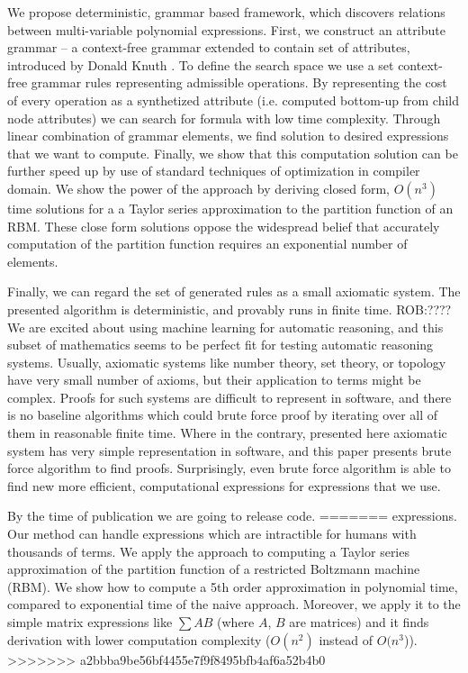 \documentclass{article}
\begin{document}
We propose deterministic, grammar based framework, which discovers relations between
multi-variable polynomial expressions. First, we construct an attribute grammar
-- a context-free grammar extended to contain set of attributes, introduced by
Donald Knuth \cite{knuth1968semantics}. To define the search space we use a set
context-free grammar rules representing admissible operations. By representing
the cost of every operation as a synthetized attribute (i.e. computed bottom-up from child node attributes)
we can search for formula with low time complexity.
Through linear combination of grammar elements, we find solution to desired 
expressions that we want to compute. Finally, we
show that this computation solution can be further speed up by use of standard
techniques of optimization in compiler domain. We show the power of the
approach by deriving closed form, $O(n^3)$ time solutions for a 
a Taylor series approximation to the partition
function of an RBM. These close form solutions oppose
the widespread belief that accurately computation of the partition function requires
an exponential number of elements.


Finally, we can regard the set of generated rules as a small axiomatic system.
The presented algorithm is deterministic, and provably runs in finite
time. ROB:????
We are excited about using machine learning for automatic reasoning, and
this subset of mathematics seems to be perfect fit for testing automatic reasoning systems.
Usually, axiomatic systems like number theory, set theory, or topology have very small
number of axioms, but their application to terms might be complex. Proofs
for such systems are difficult to represent in software, and there is no
baseline algorithms which could brute force proof by iterating over all of them in reasonable finite time.
Where in the contrary, presented here axiomatic system has very simple representation
in software, and this paper presents brute force algorithm to find proofs. 
Surprisingly, even brute force algorithm is able to find new more efficient,
computational expressions for expressions that we use.

By the time of publication we are going to release code.
=======
  expressions. Our method can handle expressions which are intractible
  for humans with thousands of
  terms. We apply the approach to
  computing a Taylor series approximation of the partition function of
  a restricted Boltzmann machine (RBM). We show how to compute a 5th
  order approximation in polynomial time, compared to exponential time
  of the naive approach. Moreover, we apply it to the simple
  matrix expressions like $\sum AB$ (where $A$, $B$ are matrices) and it finds
  derivation with lower computation complexity ($O(n^2)$ instead of $O(n^3$)).
>>>>>>> a2bbba9be56bf4455e7f9f8495bfb4af6a52b4b0
\end{document}
